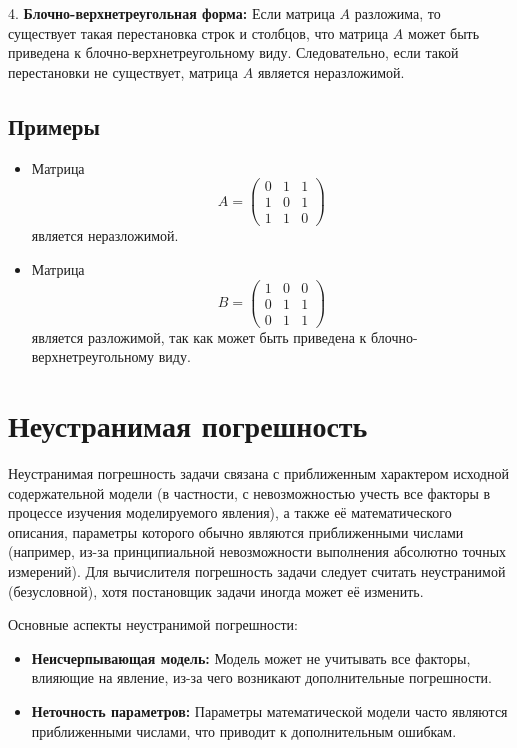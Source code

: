 \documentclass{article}
\begin{document}
4. \textbf{Блочно-верхнетреугольная форма:} Если матрица $A$ разложима, то существует такая перестановка строк и столбцов, что матрица $A$ может быть приведена к блочно-верхнетреугольному виду. Следовательно, если такой перестановки не существует, матрица $A$ является неразложимой.

\subsection*{Примеры}
\begin{itemize}
    \item Матрица
    \[
    A = \begin{pmatrix}
    0 & 1 & 1 \\
    1 & 0 & 1 \\
    1 & 1 & 0
    \end{pmatrix}
    \]
    является неразложимой.
    
    \item Матрица
    \[
    B = \begin{pmatrix}
    1 & 0 & 0 \\
    0 & 1 & 1 \\
    0 & 1 & 1
    \end{pmatrix}
    \]
    является разложимой, так как может быть приведена к блочно-верхнетреугольному виду.
\end{itemize}
\section{Неустранимая погрешность}
Неустранимая погрешность задачи связана с приближенным характером исходной содержательной модели (в частности, с невозможностью учесть все факторы в процессе изучения моделируемого явления), а также её математического описания, параметры которого обычно являются приближенными числами (например, из-за принципиальной невозможности выполнения абсолютно точных измерений). Для вычислителя погрешность задачи следует считать неустранимой (безусловной), хотя постановщик задачи иногда может её изменить.

Основные аспекты неустранимой погрешности:
\begin{itemize}
    \item \textbf{Неисчерпывающая модель:} Модель может не учитывать все факторы, влияющие на явление, из-за чего возникают дополнительные погрешности.
    \item \textbf{Неточность параметров:} Параметры математической модели часто являются приближенными числами, что приводит к дополнительным ошибкам.
\end{itemize}
\end{document}
